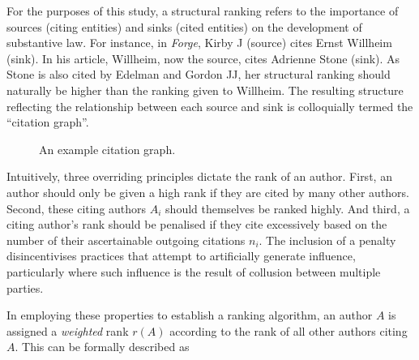 For the purposes of this study, a structural ranking refers to the importance of sources (citing entities) and sinks (cited entities) on the development of substantive law. For instance, in \textit{Forge}, Kirby J (source) cites Ernst Willheim (sink). In his article, Willheim, now the source, cites Adrienne Stone (sink). As Stone is also cited by Edelman and Gordon JJ, her structural ranking should naturally be higher than the ranking given to Willheim. The resulting structure reflecting the relationship between each source and sink is colloquially termed the ``citation graph''.

\begin{figure}[!htpb]
\centering
{}
\caption{An example citation graph.}
\end{figure}

Intuitively, three overriding principles dictate the rank of an author. First, an author should only be given a high rank if they are cited by many other authors. Second, these citing authors $A_i$ should themselves be ranked highly. And third, a citing author's rank should be penalised if they cite excessively based on the number of their ascertainable outgoing citations $n_i$. The inclusion of a penalty disincentivises practices that attempt to artificially generate influence, particularly where such influence is the result of collusion between multiple parties. 

In employing these properties to establish a ranking algorithm, an author $A$ is assigned a \emph{weighted} rank $r(A)$ according to the rank of all other authors citing $A$. This can be formally described as

